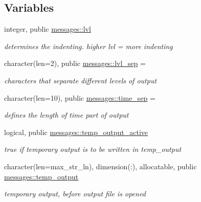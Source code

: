 \subsection*{Variables}
\begin{DoxyCompactItemize}
\item 
integer, public \hyperlink{namespacemessages_a36521a46e57da1d3be83019abdff132e}{messages\+::lvl}
\begin{DoxyCompactList}\small\item\em determines the indenting. higher {\ttfamily lvl} = more indenting \end{DoxyCompactList}\item 
character(len=2), public \hyperlink{namespacemessages_ab1101c3acf2edc71877d4aa71aa3d931}{messages\+::lvl\+\_\+sep} = \textquotesingle{}\textquotesingle{}
\begin{DoxyCompactList}\small\item\em characters that separate different levels of output \end{DoxyCompactList}\item 
character(len=10), public \hyperlink{namespacemessages_abeb2abf0ac1d1fb4f09d881eb57b3dae}{messages\+::time\+\_\+sep} = \textquotesingle{}\textquotesingle{}
\begin{DoxyCompactList}\small\item\em defines the length of time part of output \end{DoxyCompactList}\item 
logical, public \hyperlink{namespacemessages_ace8877914cfa5253cc002da0f387446a}{messages\+::temp\+\_\+output\+\_\+active}
\begin{DoxyCompactList}\small\item\em true if temporary output is to be written in {\ttfamily temp\+\_\+output} \end{DoxyCompactList}\item 
character(len=max\+\_\+str\+\_\+ln), dimension(\+:), allocatable, public \hyperlink{namespacemessages_a07070e72f15146af24816c39eea17088}{messages\+::temp\+\_\+output}
\begin{DoxyCompactList}\small\item\em temporary output, before output file is opened \end{DoxyCompactList}\end{DoxyCompactItemize}
